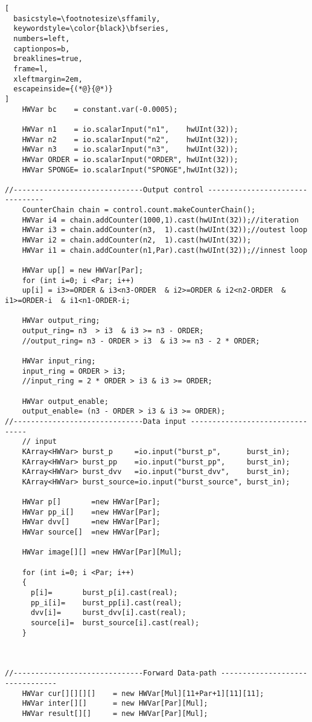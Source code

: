 \begin{lstlisting}[
  basicstyle=\footnotesize\sffamily,
  keywordstyle=\color{black}\bfseries,
  numbers=left,
  captionpos=b,
  breaklines=true,
  frame=l,
  xleftmargin=2em,
  escapeinside={(*@}{@*)}
]
    HWVar bc    = constant.var(-0.0005);

    HWVar n1    = io.scalarInput("n1",    hwUInt(32));
    HWVar n2    = io.scalarInput("n2",    hwUInt(32));
    HWVar n3    = io.scalarInput("n3",    hwUInt(32));
    HWVar ORDER = io.scalarInput("ORDER", hwUInt(32));
    HWVar SPONGE= io.scalarInput("SPONGE",hwUInt(32));

//------------------------------Output control --------------------------------
    CounterChain chain = control.count.makeCounterChain();
    HWVar i4 = chain.addCounter(1000,1).cast(hwUInt(32));//iteration
    HWVar i3 = chain.addCounter(n3,  1).cast(hwUInt(32));//outest loop
    HWVar i2 = chain.addCounter(n2,  1).cast(hwUInt(32));
    HWVar i1 = chain.addCounter(n1,Par).cast(hwUInt(32));//innest loop

    HWVar up[] = new HWVar[Par];
    for (int i=0; i <Par; i++)
    up[i] = i3>=ORDER & i3<n3-ORDER  & i2>=ORDER & i2<n2-ORDER  & i1>=ORDER-i  & i1<n1-ORDER-i;

    HWVar output_ring;
    output_ring= n3  > i3  & i3 >= n3 - ORDER;
    //output_ring= n3 - ORDER > i3  & i3 >= n3 - 2 * ORDER;

    HWVar input_ring;
    input_ring = ORDER > i3;
    //input_ring = 2 * ORDER > i3 & i3 >= ORDER;

    HWVar output_enable;
    output_enable= (n3 - ORDER > i3 & i3 >= ORDER);
//------------------------------Data input --------------------------------
    // input
    KArray<HWVar> burst_p     =io.input("burst_p",      burst_in);
    KArray<HWVar> burst_pp    =io.input("burst_pp",     burst_in);
    KArray<HWVar> burst_dvv   =io.input("burst_dvv",    burst_in);
    KArray<HWVar> burst_source=io.input("burst_source", burst_in);

    HWVar p[]       =new HWVar[Par];
    HWVar pp_i[]    =new HWVar[Par];
    HWVar dvv[]     =new HWVar[Par];
    HWVar source[]  =new HWVar[Par];

    HWVar image[][] =new HWVar[Par][Mul];

    for (int i=0; i <Par; i++)
    {
      p[i]=       burst_p[i].cast(real);
      pp_i[i]=    burst_pp[i].cast(real);
      dvv[i]=     burst_dvv[i].cast(real);
      source[i]=  burst_source[i].cast(real);
    }



//------------------------------Forward Data-path --------------------------------
    HWVar cur[][][][]    = new HWVar[Mul][11+Par+1][11][11];
    HWVar inter[][]      = new HWVar[Par][Mul];
    HWVar result[][]     = new HWVar[Par][Mul];


\end{lstlisting}
